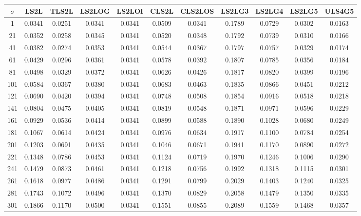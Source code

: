 \begin{table}[ht!]
\centering
\begin{tabular}{c|c|c|c|c|c|c|c|c|c|c}
$\sigma$ & \scriptsize{LS2L} & \scriptsize{TLS2L} & \scriptsize{LS2LOG} & \scriptsize{LS2LOI} & \scriptsize{CLS2L} & \scriptsize{CLS2LOS} & \scriptsize{LS2LG3} & \scriptsize{LS2LG4} & \scriptsize{LS2LG5} & \scriptsize{ULS4G5}\\ \hline 
1 & 0.0341 & 0.0251 & 0.0341 & 0.0341 & 0.0509 & 0.0341 & 0.1789 & 0.0729 & 0.0302 & 0.0163 \\ \hline
21 & 0.0352 & 0.0258 & 0.0345 & 0.0341 & 0.0520 & 0.0348 & 0.1792 & 0.0739 & 0.0310 & 0.0166 \\ \hline
41 & 0.0382 & 0.0274 & 0.0353 & 0.0341 & 0.0544 & 0.0367 & 0.1797 & 0.0757 & 0.0329 & 0.0174 \\ \hline
61 & 0.0429 & 0.0296 & 0.0361 & 0.0341 & 0.0578 & 0.0392 & 0.1807 & 0.0785 & 0.0356 & 0.0184 \\ \hline
81 & 0.0498 & 0.0329 & 0.0372 & 0.0341 & 0.0626 & 0.0426 & 0.1817 & 0.0820 & 0.0399 & 0.0196 \\ \hline
101 & 0.0584 & 0.0367 & 0.0380 & 0.0341 & 0.0683 & 0.0463 & 0.1835 & 0.0866 & 0.0451 & 0.0212 \\ \hline
121 & 0.0690 & 0.0420 & 0.0394 & 0.0341 & 0.0748 & 0.0508 & 0.1854 & 0.0916 & 0.0518 & 0.0218 \\ \hline
141 & 0.0804 & 0.0475 & 0.0405 & 0.0341 & 0.0819 & 0.0548 & 0.1871 & 0.0971 & 0.0596 & 0.0229 \\ \hline
161 & 0.0929 & 0.0536 & 0.0414 & 0.0341 & 0.0899 & 0.0588 & 0.1890 & 0.1028 & 0.0680 & 0.0249 \\ \hline
181 & 0.1067 & 0.0614 & 0.0424 & 0.0341 & 0.0976 & 0.0634 & 0.1917 & 0.1100 & 0.0784 & 0.0254 \\ \hline
201 & 0.1203 & 0.0691 & 0.0435 & 0.0341 & 0.1046 & 0.0671 & 0.1941 & 0.1170 & 0.0890 & 0.0272 \\ \hline
221 & 0.1348 & 0.0786 & 0.0453 & 0.0341 & 0.1124 & 0.0719 & 0.1970 & 0.1246 & 0.1006 & 0.0290 \\ \hline
241 & 0.1479 & 0.0873 & 0.0461 & 0.0341 & 0.1218 & 0.0756 & 0.1992 & 0.1318 & 0.1115 & 0.0301 \\ \hline
261 & 0.1618 & 0.0977 & 0.0486 & 0.0341 & 0.1291 & 0.0799 & 0.2029 & 0.1403 & 0.1240 & 0.0325 \\ \hline
281 & 0.1743 & 0.1072 & 0.0496 & 0.0341 & 0.1370 & 0.0829 & 0.2058 & 0.1479 & 0.1350 & 0.0335 \\ \hline
301 & 0.1866 & 0.1170 & 0.0500 & 0.0341 & 0.1551 & 0.0855 & 0.2089 & 0.1559 & 0.1468 & 0.0357 \\ \hline

\end{tabular}
\end{table}
